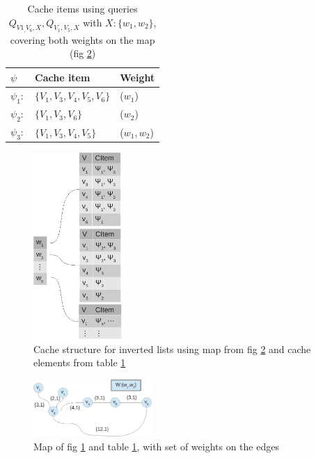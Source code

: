 \begin{table}
\begin{tabular}{l|l|l}\hline
$\psi$		& Cache item 			& Weight \\\hline  \hline
$\psi_1:$	& $\{V_1,V_3,V_4,V_5,V_6\}$ 	& ($w_1$)\\\hline
$\psi_2:$	& $\{V_1,V_3,V_6\}$ 		& ($w_2$)\\\hline
$\psi_3:$	& $\{V_1,V_3,V_4,V_5\}$ 	& ($w_1,w_2$)\\\hline
\end{tabular}
\caption{Cache items using queries $Q_{V1_,V_6,X}, Q_{V_1,V_5,X}$ with $X:\{w_1,w_2\}$, covering both weights on the map (fig \ref{fig:map1})}
\label{tab:expsi}
\end{table}


\begin{figure}[hbt]
  \center
        \includegraphics[width=0.3\textwidth]{figures/wilist}
        \caption{Cache structure for inverted lists using map from fig \ref{fig:map1} and cache elements from table \ref{tab:expsi}}
  \label{fig:wilist}
\end{figure}

\begin{figure}[hbt]
  \center
        \includegraphics[width=0.4\textwidth]{figures/map1}
        \caption{Map of fig \ref{fig:wilist} and table \ref{tab:expsi}, with set of weights on the edges}
  \label{fig:map1}
\end{figure}


